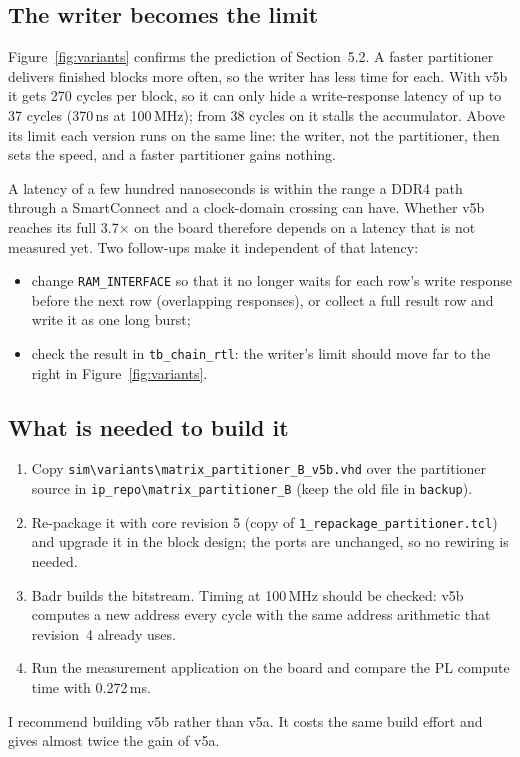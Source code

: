 \documentclass[11pt,a4paper]{article}
\newcommand{\code}[1]{\texttt{#1}}
\begin{document}
\subsection{The writer becomes the limit}
Figure~\ref{fig:variants} confirms the prediction of Section~5.2. A faster partitioner delivers finished blocks more often, so the writer has less time for each. With v5b it gets 270 cycles per block, so it can only hide a write-response latency of up to 37 cycles (370\,ns at 100\,MHz); from 38 cycles on it stalls the accumulator. Above its limit each version runs on the same line: the writer, not the partitioner, then sets the speed, and a faster partitioner gains nothing.

A latency of a few hundred nanoseconds is within the range a DDR4 path through a SmartConnect and a clock-domain crossing can have. Whether v5b reaches its full 3.7$\times$ on the board therefore depends on a latency that is not measured yet. Two follow-ups make it independent of that latency:
\begin{itemize}[noitemsep]
  \item change \code{RAM\_INTERFACE} so that it no longer waits for each row's write response before the next row (overlapping responses), or collect a full result row and write it as one long burst;
  \item check the result in \code{tb\_chain\_rtl}: the writer's limit should move far to the right in Figure~\ref{fig:variants}.
\end{itemize}

\subsection{What is needed to build it}
\begin{enumerate}[noitemsep]
  \item Copy \code{sim\textbackslash variants\textbackslash matrix\_partitioner\_B\_v5b.vhd} over the partitioner source in \code{ip\_repo\textbackslash}\allowbreak\code{matrix\_partitioner\_B} (keep the old file in \code{backup}).
  \item Re-package it with core revision 5 (copy of \code{1\_repackage\_partitioner.tcl}) and upgrade it in the block design; the ports are unchanged, so no rewiring is needed.
  \item Badr builds the bitstream. Timing at 100\,MHz should be checked: v5b computes a new address every cycle with the same address arithmetic that revision~4 already uses.
  \item Run the measurement application on the board and compare the PL compute time with 0.272\,ms.
\end{enumerate}
I recommend building v5b rather than v5a. It costs the same build effort and gives almost twice the gain of v5a.
\end{document}
